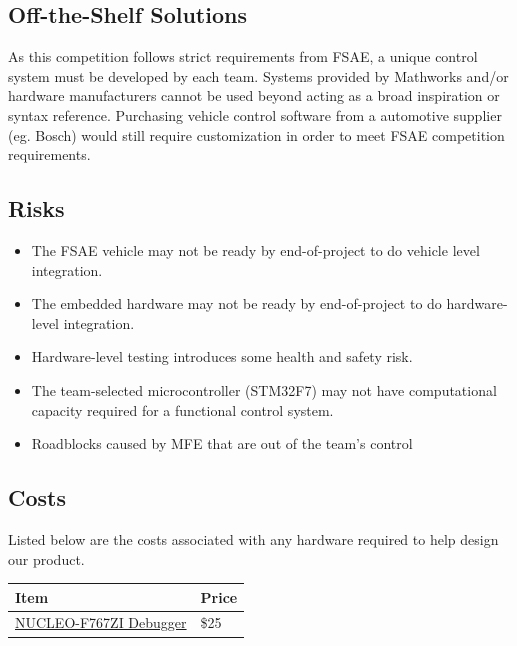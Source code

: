 \documentclass[12pt]{article}
\begin{document}
\subsection{Off-the-Shelf Solutions}
As this competition follows strict requirements from FSAE, a unique control system must be developed by each team. Systems provided by Mathworks and/or hardware manufacturers cannot be used beyond acting as a broad inspiration or syntax reference. 
Purchasing vehicle control software from a automotive supplier (eg. Bosch) would still require customization in order to meet FSAE competition requirements. 

\subsection{Risks}
\begin{itemize}
    \item The FSAE vehicle may not be ready by end-of-project to do vehicle level integration. 
    \item The embedded hardware may not be ready by end-of-project to do hardware-level integration. 
    \item Hardware-level testing introduces some health and safety risk.
    \item The team-selected microcontroller (STM32F7) may not have computational capacity required for a functional control system.
\end{itemize}

\begin{itemize}
    \item Roadblocks caused by MFE that are out of the team's control
\end{itemize}

\subsection{Costs}
Listed below are the costs associated with any hardware required to help design our product.

\vspace{3mm}
\noindent
\begin{tabular}{| p{} | p{}|}
\hline
\rowcolor[gray]{0.9}
Item & Price \\
\hline
\href{https://www.digikey.ca/en/products/detail/stmicroelectronics/NUCLEO-F767ZI/6004740}{NUCLEO-F767ZI Debugger}& \$25 \\
\hline
\end{tabular}
\\
\end{document}
